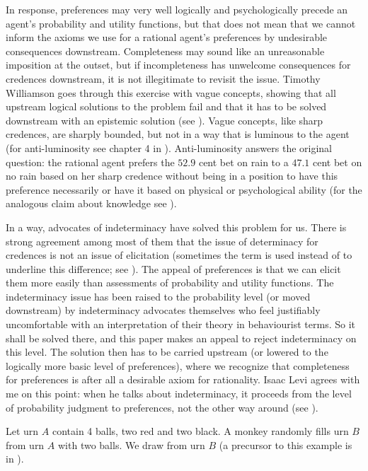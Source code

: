 \documentclass[11pt]{article}
\begin{document}
In response, preferences may very well logically and psychologically
precede an agent's probability and utility functions, but that does
not mean that we cannot inform the axioms we use for a rational
agent's preferences by undesirable consequences downstream.
Completeness may sound like an unreasonable imposition at the outset,
but if incompleteness has unwelcome consequences for credences
downstream, it is not illegitimate to revisit the issue. Timothy
Williamson goes through this exercise with vague concepts, showing
that all upstream logical solutions to the problem fail and that it
has to be solved downstream with an epistemic solution (see
). Vague concepts, like sharp credences, are
sharply bounded, but not in a way that is luminous to the agent (for
anti-luminosity see chapter 4 in ).
Anti-luminosity answers the original question: the rational agent
prefers the $52.9$ cent bet on rain to a $47.1$ cent bet on no rain
based on her sharp credence without being in a position to have this
preference necessarily or have it based on physical or psychological
ability (for the analogous claim about knowledge see
).

In a way, advocates of indeterminacy have solved this problem for us.
There is strong agreement among most of them that the issue of
determinacy for credences is not an issue of elicitation (sometimes
the term  is used instead of 
to underline this difference; see ). The appeal
of preferences is that we can elicit them more easily than assessments
of probability and utility functions. The indeterminacy issue has been
raised to the probability level (or moved downstream) by indeterminacy
advocates themselves who feel justifiably uncomfortable with an
interpretation of their theory in behaviourist terms. So it shall be
solved there, and this paper makes an appeal to reject indeterminacy
on this level. The solution then has to be carried upstream (or
lowered to the logically more basic level of preferences), where we
recognize that completeness for preferences is after all a desirable
axiom for rationality. Isaac Levi agrees with me on this point: when
he talks about indeterminacy, it proceeds from the level of
probability judgment to preferences, not the other way around (see
).

\begin{quotex}
  \label{ex:monkey} Let urn $A$ contain 4
  balls, two red and two black. A monkey randomly fills urn $B$ from
  urn $A$ with two balls. We draw from urn $B$ (a precursor to this
  example is in ).
\end{quotex}
\end{document}

